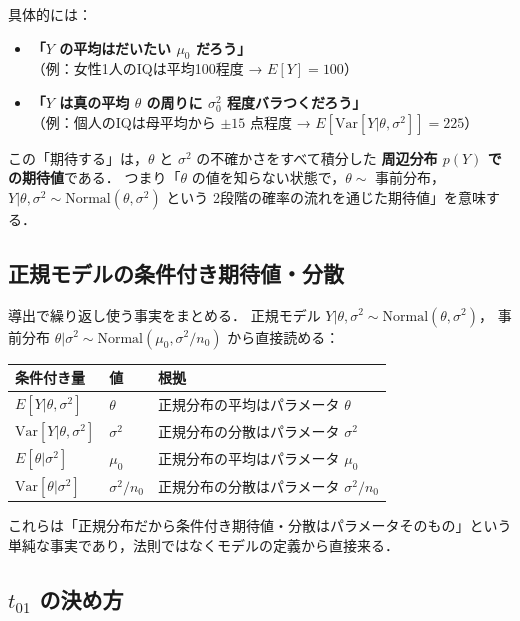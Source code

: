\documentclass[lualatex,ja=standard,a4paper,12pt]{bxjsarticle}
\begin{document}
具体的には：
\begin{itemize}
  \item \textbf{「$Y$ の平均はだいたい $\mu_0$ だろう」}\\
        （例：女性1人のIQは平均100程度 → $E[Y] = 100$）
  \item \textbf{「$Y$ は真の平均 $\theta$ の周りに $\sigma_0^2$ 程度バラつくだろう」}\\
        （例：個人のIQは母平均から $\pm 15$ 点程度 → $E[\mathrm{Var}[Y|\theta,\sigma^2]] = 225$）
\end{itemize}

この「期待する」は，$\theta$ と $\sigma^2$ の不確かさをすべて積分した
\textbf{周辺分布 $p(Y)$ での期待値}である．
つまり「$\theta$ の値を知らない状態で，$\theta \sim$ 事前分布，
$Y|\theta,\sigma^2 \sim \mathrm{Normal}(\theta,\sigma^2)$ という
2段階の確率の流れを通じた期待値」を意味する．

\subsection*{正規モデルの条件付き期待値・分散}

導出で繰り返し使う事実をまとめる．
正規モデル $Y|\theta,\sigma^2 \sim \mathrm{Normal}(\theta,\sigma^2)$，
事前分布 $\theta|\sigma^2 \sim \mathrm{Normal}(\mu_0, \sigma^2/n_0)$ から直接読める：

\begin{center}
\renewcommand{\arraystretch}{1.5}
\begin{tabular}{lll}
\toprule
条件付き量 & 値 & 根拠 \\
\midrule
$E[Y|\theta,\sigma^2]$ & $\theta$ & 正規分布の平均はパラメータ $\theta$ \\
$\mathrm{Var}[Y|\theta,\sigma^2]$ & $\sigma^2$ & 正規分布の分散はパラメータ $\sigma^2$ \\
$E[\theta|\sigma^2]$ & $\mu_0$ & 正規分布の平均はパラメータ $\mu_0$ \\
$\mathrm{Var}[\theta|\sigma^2]$ & $\sigma^2/n_0$ & 正規分布の分散はパラメータ $\sigma^2/n_0$ \\
\bottomrule
\end{tabular}
\end{center}

\noindent これらは「正規分布だから条件付き期待値・分散はパラメータそのもの」という
単純な事実であり，法則ではなくモデルの定義から直接来る．

\subsection*{$t_{01}$ の決め方}
\end{document}

